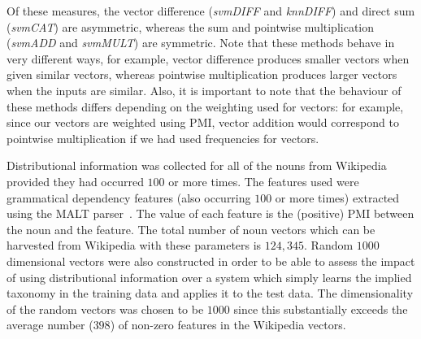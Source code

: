 \documentclass[11pt]{article}
\begin{document}
Of these measures, the vector difference (\emph{svm\-DIFF} and
\emph{knnDIFF}) and direct sum (\emph{svmCAT}) are asymmetric, whereas
the sum and pointwise multiplication (\emph{svmADD} and
\emph{svmMULT}) are symmetric. Note that these methods behave in very
different ways, for example, vector difference produces smaller
vectors when given similar vectors, whereas pointwise multiplication
produces larger vectors when the inputs are similar. Also, it is
important to note that the behaviour of these methods differs
depending on the weighting used for vectors: for example, since our
vectors are weighted using PMI, vector addition would correspond to
pointwise multiplication if we had used frequencies for vectors.





Distributional information was collected for all of the nouns from Wikipedia provided they had occurred $100$ or more times.  The features used were grammatical dependency features (also occurring $100$ or more times) extracted using the MALT parser~\cite{Nivre2006}.  The value of each feature is the (positive) PMI between the noun and the feature. The total number of noun vectors which can be harvested from Wikipedia with these parameters is $124,345$.  Random $1000$ dimensional vectors were also constructed in order to be able to assess the impact of using distributional information over a system which simply learns the implied taxonomy in the training data and applies it to the test data.  The dimensionality of the random vectors was chosen to be $1000$ since this substantially exceeds the average number ($398$) of non-zero features in the Wikipedia vectors.
\end{document}

